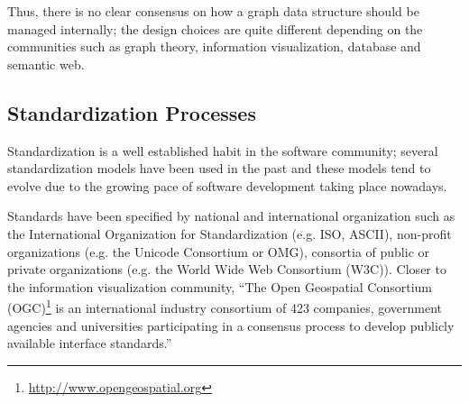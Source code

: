 Thus, there is no clear consensus on how a graph data structure should
be managed internally; the design choices are quite different
depending on the communities such as graph theory, information
visualization, database and semantic web.


\subsection{Standardization Processes}

Standardization is a well established habit in the software community;
several standardization models have been used in the past and these
models tend to evolve due to the growing pace of software development
taking place nowadays.

Standards have been specified by national and international
organization such as the International Organization for
Standardization (e.g. ISO, ASCII), non-profit organizations (e.g. the
Unicode Consortium or OMG), consortia of public or private
organizations (e.g. the World Wide Web Consortium (W3C)). Closer to
the information visualization community, ``The Open Geospatial
Consortium (OGC)\footnote{\url{http://www.opengeospatial.org}} is an
international industry consortium of 423 companies, government
agencies and universities participating in a consensus process to
develop publicly available interface standards.''

